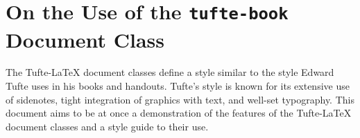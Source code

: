 \documentclass{tufte-book} %
\newcommand{\measure}[3]{#1/#2$\times$\unit[#3]{pc}} %
\newcommand{\BE}{\textit{Beautiful Evidence}\xspace}
\newcommand{\TL}{Tufte-\LaTeX\xspace}
\begin{document}
%
%
%
%
%


\chapter[On the Use of the tufte-book Document Class]{On the Use of the \texttt{tufte-book} Document Class}
\label{ch:tufte-book}

The \TL document classes define a style similar to the style Edward Tufte uses in his books and handouts. Tufte's style is known for its extensive use of sidenotes, tight integration of graphics with text, and well-set typography. This document aims to be at once a demonstration of the features of the \TL document classes and a style guide to their use.
\end{document}
